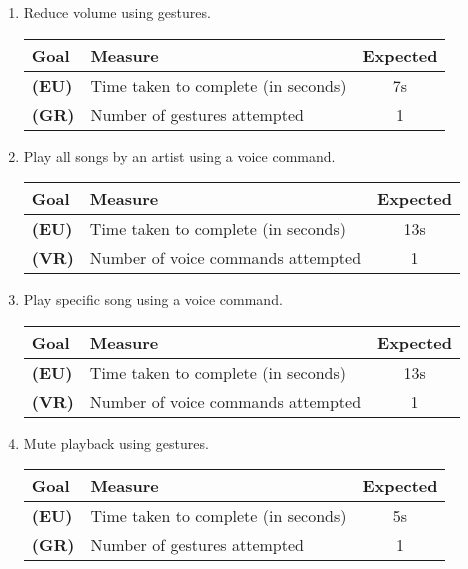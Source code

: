 \documentclass[12pt,letterpaper]{article}
\begin{document}
\begin{enumerate}
\item Reduce volume using gestures.
\begin{center}\begin{tabular}{l|l|c}
\textbf{Goal} & \textbf{Measure} & \textbf{Expected} \\
\hline
\textbf{(EU)} & Time taken to complete (in seconds) & 7s \\
\hline
\textbf{(GR)} & Number of gestures attempted & 1 \\
\hline
\end{tabular}\end{center}

\item Play all songs by an artist using a voice command.
\begin{center}\begin{tabular}{l|l|c}
\textbf{Goal} & \textbf{Measure} & \textbf{Expected} \\
\hline
\textbf{(EU)} & Time taken to complete (in seconds) & 13s \\
\hline
\textbf{(VR)} & Number of voice commands attempted & 1 \\
\hline
\end{tabular}\end{center}

\item Play specific song using a voice command.
\begin{center}\begin{tabular}{l|l|c}
\textbf{Goal} & \textbf{Measure} & \textbf{Expected} \\
\hline
\textbf{(EU)} & Time taken to complete (in seconds) & 13s \\
\hline
\textbf{(VR)} & Number of voice commands attempted & 1 \\
\hline
\end{tabular}\end{center}

\item Mute playback using gestures.
\begin{center}\begin{tabular}{l|l|c}
\textbf{Goal} & \textbf{Measure} & \textbf{Expected} \\
\hline
\textbf{(EU)} & Time taken to complete (in seconds) & 5s \\
\hline
\textbf{(GR)} & Number of gestures attempted & 1 \\
\hline
\end{tabular}\end{center}


\end{enumerate}
\end{document}
